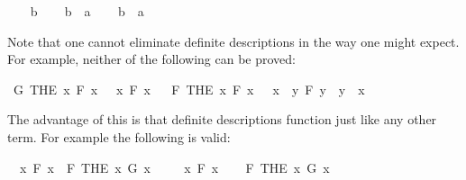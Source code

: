 \begin{isabellebody}
\isanewline
{}\isamarkupfalse%
\isanewline
\ \ \isamarkupfalse%
\ b\isanewline
\ \ \isamarkupfalse%
\ {\isachardoublequoteopen}b\ {\isacharequal}\ a{\isachardoublequoteclose}\isanewline
\ \ \isamarkupfalse%
\ {\isachardoublequoteopen}b\ {\isacharequal}\ a{\isachardoublequoteclose}\isacommand{{\isachardot}}\isamarkupfalse%
\isanewline
{}\isamarkupfalse%
%
\endisatagproof
{\isafoldproof}%
%
\isadelimproof
%
\endisadelimproof
%
\begin{isamarkuptext}%
Note that one cannot eliminate definite descriptions in the way one might expect. For example,
neither of the following can be proved:%
\end{isamarkuptext}\isamarkuptrue%
\isamarkupfalse%
\ {\isachardoublequoteopen}G\ {\isacharparenleft}THE\ x{\isachardot}\ F\ x{\isacharparenright}\ {\isasymlongrightarrow}\ {\isacharparenleft}{\isasymexists}\ x{\isachardot}\ F\ x{\isacharparenright}{\isachardoublequoteclose}%
\isadelimproof
\ %
\endisadelimproof
%
\isatagproof
{}\isamarkupfalse%
%
\endisatagproof
{\isafoldproof}%
%
\isadelimproof
%
\endisadelimproof
\isanewline
{}\isamarkupfalse%
\ {\isachardoublequoteopen}F\ {\isacharparenleft}THE\ x{\isachardot}\ F\ x{\isacharparenright}\ {\isasymlongrightarrow}\ {\isacharparenleft}{\isasymexists}\ x{\isachardot}\ {\isasymforall}\ y{\isachardot}\ F\ y\ {\isasymlongrightarrow}\ y\ {\isacharequal}\ x{\isacharparenright}{\isachardoublequoteclose}%
\isadelimproof
\ %
\endisadelimproof
%
\isatagproof
{}\isamarkupfalse%
%
\endisatagproof
{\isafoldproof}%
%
\isadelimproof
%
\endisadelimproof
%
\begin{isamarkuptext}%
The advantage of this is that definite descriptions function just like any other term. For
example the following is valid:%
\end{isamarkuptext}\isamarkuptrue%
\isamarkupfalse%
\ {\isachardoublequoteopen}{\isacharparenleft}{\isasymforall}\ x{\isachardot}\ F\ x{\isacharparenright}\ {\isasymlongrightarrow}\ F\ {\isacharparenleft}THE\ x{\isachardot}\ G\ x{\isacharparenright}{\isachardoublequoteclose}\isanewline
%
\isadelimproof
%
\endisadelimproof
%
\isatagproof
{}\isamarkupfalse%
\isanewline
\ \ \isamarkupfalse%
\ {\isachardoublequoteopen}{\isasymforall}\ x{\isachardot}\ F\ x{\isachardoublequoteclose}\isanewline
\ \ \isamarkupfalse%
\ {\isachardoublequoteopen}F\ {\isacharparenleft}THE\ x{\isachardot}\ G\ x{\isacharparenright}{\isachardoublequoteclose}\ \isamarkupfalse%

\end{isabellebody}

